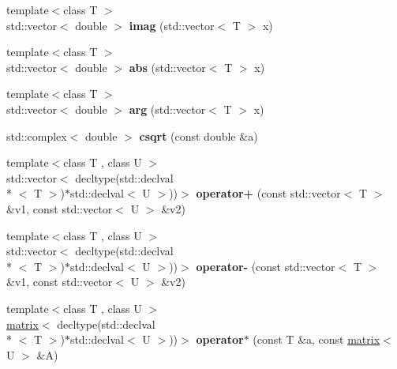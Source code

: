 \begin{DoxyCompactItemize}
\item 
\hypertarget{namespacekeycpp_a22cc33e0299a65158c81352603bcd35a}{{\footnotesize template$<$class T $>$ }\\std\-::vector$<$ double $>$ {\bfseries imag} (std\-::vector$<$ T $>$ x)}\label{namespacekeycpp_a22cc33e0299a65158c81352603bcd35a}

\item 
\hypertarget{namespacekeycpp_a01edbbe2645ae65b6ec2c08b2d4352e4}{{\footnotesize template$<$class T $>$ }\\std\-::vector$<$ double $>$ {\bfseries abs} (std\-::vector$<$ T $>$ x)}\label{namespacekeycpp_a01edbbe2645ae65b6ec2c08b2d4352e4}

\item 
\hypertarget{namespacekeycpp_a70d66686c6b209cc8eb64f84977544da}{{\footnotesize template$<$class T $>$ }\\std\-::vector$<$ double $>$ {\bfseries arg} (std\-::vector$<$ T $>$ x)}\label{namespacekeycpp_a70d66686c6b209cc8eb64f84977544da}

\item 
\hypertarget{namespacekeycpp_a952e5296774667c3be4e792b5cd980da}{std\-::complex$<$ double $>$ {\bfseries csqrt} (const double \&a)}\label{namespacekeycpp_a952e5296774667c3be4e792b5cd980da}

\item 
\hypertarget{namespacekeycpp_a4da6882977b2262f8d6f080b0eaf60c5}{{\footnotesize template$<$class T , class U $>$ }\\std\-::vector$<$ decltype(std\-::declval\\*
$<$ T $>$)$\ast$std\-::declval$<$ U $>$))$>$ {\bfseries operator+} (const std\-::vector$<$ T $>$ \&v1, const std\-::vector$<$ U $>$ \&v2)}\label{namespacekeycpp_a4da6882977b2262f8d6f080b0eaf60c5}

\item 
\hypertarget{namespacekeycpp_ab185edce957f4afd65cb641ec6307376}{{\footnotesize template$<$class T , class U $>$ }\\std\-::vector$<$ decltype(std\-::declval\\*
$<$ T $>$)$\ast$std\-::declval$<$ U $>$))$>$ {\bfseries operator-\/} (const std\-::vector$<$ T $>$ \&v1, const std\-::vector$<$ U $>$ \&v2)}\label{namespacekeycpp_ab185edce957f4afd65cb641ec6307376}

\item 
\hypertarget{namespacekeycpp_a8d5dbf37b71d16d686dd0fdbad82f8fb}{{\footnotesize template$<$class T , class U $>$ }\\\hyperlink{classkeycpp_1_1matrix}{matrix}$<$ decltype(std\-::declval\\*
$<$ T $>$)$\ast$std\-::declval$<$ U $>$))$>$ {\bfseries operator$\ast$} (const T \&a, const \hyperlink{classkeycpp_1_1matrix}{matrix}$<$ U $>$ \&A)}\label{namespacekeycpp_a8d5dbf37b71d16d686dd0fdbad82f8fb}


\end{DoxyCompactItemize}
